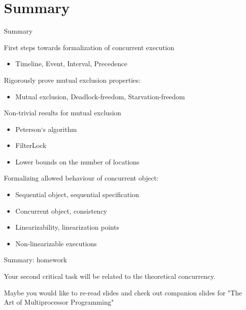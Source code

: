 \section{Summary}

\begin{frame}{Summary}

First steps towards formalization of concurrent execution
\begin{itemize}
  \item Timeline, Event, Interval, Precedence
\end{itemize}

Rigorously prove mutual exclusion properties:
\begin{itemize}
  \item Mutual exclusion, Deadlock-freedom, Starvation-freedom
\end{itemize}

Non-trivial results for mutual exclusion
\begin{itemize}
  \item Peterson`s algorithm
  \item FilterLock
  \item Lower bounds on the number of locations
\end{itemize}

Formalizing allowed behaviour of concurrent object:
\begin{itemize}
  \item Sequential object, sequential specification
  \item Concurrent object, consistency
  \item Linearizability, linearization points
  \item Non-linearizable executions
\end{itemize}

\end{frame}


\begin{frame}{Summary: homework}

Your second critical task will be related to the theoretical concurrency.

Maybe you would like to re-read slides and check out companion slides for "The Art of Multiprocessor Programming"

\end{frame}




